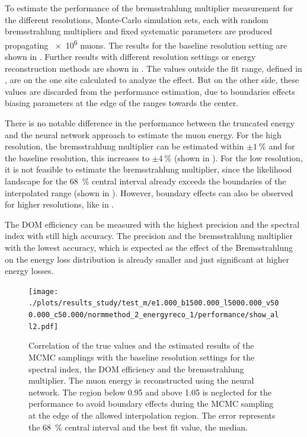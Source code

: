 To estimate the performance of the bremsstrahlung multiplier measurement for the different resolutions, Monte-Carlo simulation sets, each with random bremsstrahlung multipliers and fixed systematic parameters are produced propagating \num{e6} muons.
The results for the baseline resolution setting are shown in .
Further results with different resolution settings or energy reconstruction methods are shown in .
The values outside the fit range, defined in , are on the one site calculated to analyze the effect.
But on the other side, these values are discarded from the performance estimation, due to boundaries effects biasing parameters at the edge of the ranges towards the center.

There is no notable difference in the performance between the truncated energy and the neural network approach to estimate the muon energy.
For the high resolution, the bremsstrahlung multiplier can be estimated within $\pm\SI{1}{\%}$ and for the baseline resolution, this increases to $\pm\SI{4}{\%}$ (shown in ).
For the low resolution, it is not feasible to estimate the bremsstrahlung multiplier, since the likelihood landscape for the \SI{68}{\%} central interval already exceeds the boundaries of the interpolated range (shown in ).
However, boundary effects can also be observed for higher resolutions, like in .

The DOM efficiency can be measured with the highest precision and the spectral index with still high accuracy.
The precision and the bremsstrahlung multiplier with the lowest accuracy, which is expected as the effect of the Bremsstrahlung on the energy loss distribution is already smaller and just significant at higher energy losses.
\begin{figure}
    \centering
    \texttt{[image: ./plots/results\_study/test\_m/e1.000\_b1500.000\_l5000.000\_v500.000\_c50.000/normmethod\_2\_energyreco\_1/performance/show\_all2.pdf]}
    \caption{Correlation of the true values and the estimated results of the MCMC samplings with the baseline resolution settings for the spectral index, the DOM efficiency and the bremsstrahlung multiplier. The muon energy is reconstructed using the neural network. The region below 0.95 and above 1.05 is neglected for the performance to avoid boundary effects during the MCMC sampling at the edge of the allowed interpolation region. The error represents the \SI{68}{\%} central interval and the best fit value, the median.}
    \label{fig:study_result_corr}
\end{figure}


